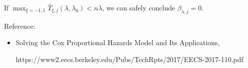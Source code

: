 \documentclass{article}
\begin{document}
If $\max_{\xi=-1,1}\bar{T}_{\xi,j}(\lambda,\lambda_0)<n\lambda$, we can safely conclude $\beta_{\lambda,j}=0$.






\vspace{5cm}
Reference:
\begin{itemize}
    \item Solving the Cox Proportional Hazards Model and Its
Applications, 

https://www2.eecs.berkeley.edu/Pubs/TechRpts/2017/EECS-2017-110.pdf
\end{itemize}
\end{document}
